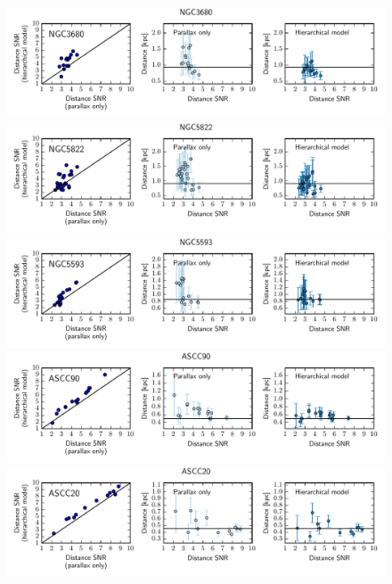 \documentclass[manuscript, letterpaper]{aastex6}
\begin{document}
\begin{figure}
\hspace*{-3mm}\includegraphics[width=15.8cm, trim = 0cm 1.65cm 0cm 0.65cm, clip]{NGC3680_metrics}
\hspace*{-3mm}\includegraphics[width=15.8cm, trim = 0cm 1.65cm 0cm 0.65cm, clip]{NGC5822_metrics}
\hspace*{-3mm}\includegraphics[width=15.8cm, trim = 0cm 1.65cm 0cm 0.65cm, clip]{NGC5593_metrics}
\hspace*{-3mm}\includegraphics[width=15.8cm, trim = 0cm 1.65cm 0cm 0.65cm, clip]{ASCC90_metrics}
\hspace*{-3mm}\includegraphics[width=15.8cm, trim = 0cm 1.65cm 0cm 0.65cm, clip]{ASCC20_metrics}

\end{figure}
\end{document}
